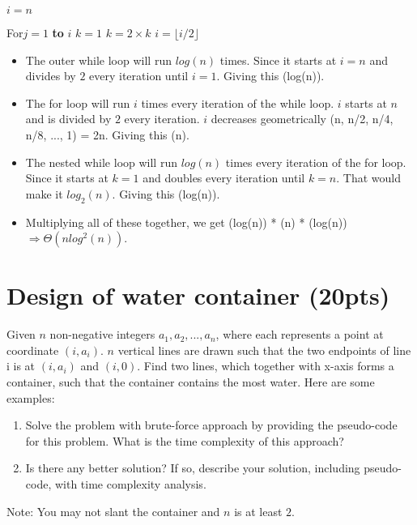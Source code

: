 \documentclass{article}[12pt]
\begin{document}
\hfill \break

\begin{algorithmic}
\State $i = n$

    For{$j = 1$ \textbf{to} $i$}
        \State $k = 1$
            \State $k = 2 \times k$
    \State $i = \lfloor i / 2 \rfloor$
\EndFunction
\end{algorithmic}

\begin{itemize}
  \item The outer while loop will run $log(n)$ times.
    Since it starts at $i = n$ and divides by $2$ every iteration until $i = 1$.
    Giving this \Theta(log(n)).

  \item The for loop will run $i$ times every iteration of the while loop.
    $i$ starts at $n$ and is divided by $2$ every iteration. $i$ decreases geometrically
    (n, n/2, n/4, n/8, ..., 1) = 2n. Giving this \Theta(n).

  \item The nested while loop will run $log(n)$ times every iteration of the for loop.
    Since it starts at $k = 1$ and doubles every iteration until $k = n$. 
    That would make it $log_2(n)$.
    Giving this \Theta(log(n)).

  \item Multiplying all of these together, we get \Theta(log(n)) * \Theta(n) * \Theta(log(n))
    $\Rightarrow \Theta(nlog^2(n))$.
\end{itemize}

\newpage
\section{Design of water container (20pts)}
Given $n$ non-negative integers $a_1, a_2, ..., a_n$, where each represents a point at coordinate $(i, a_i)$. $n$ vertical lines are drawn such that the two endpoints of line i is at $(i, a_i)$ and $(i, 0)$. Find two lines, which together with x-axis forms a container, such that the container contains the most water. Here are some examples:

\begin{enumerate}
\item {Solve the problem with brute-force approach by providing the pseudo-code for this problem. What is the time complexity of this approach?}
\item {Is there any better solution? If so, describe your solution, including pseudo-code, with time complexity analysis.}
\end{enumerate}
{Note: You may not slant the container and $n$ is at least $2$.}
\end{document}

